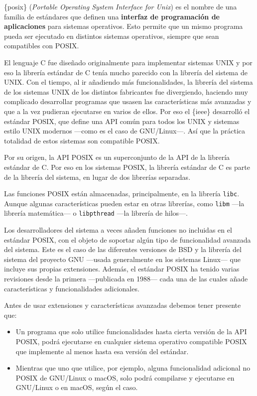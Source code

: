 \{posix\} (\emph{Portable Operating System Interface for Unix}) es el
nombre de una familia de estándares que definen una \textbf{interfaz de
programación de aplicaciones} para sistemas operativos. Esto permite que
un mismo programa pueda ser ejecutado en distintos sistemas operativos,
siempre que sean compatibles con POSIX.

El lenguaje C fue diseñado originalmente para implementar sistemas UNIX
y por eso la librería estándar de C tenía mucho parecido con la librería
del sistema de UNIX. Con el tiempo, al ir añadiendo más funcionalidades,
la librería del sistema de los sistemas UNIX de los distintos
fabricantes fue divergiendo, haciendo muy complicado desarrollar
programas que usasen las características más avanzadas y que a la vez
pudieran ejecutarse en varios de ellos. Por eso el \{ieee\} desarrolló
el estándar POSIX, que define una API común para todos los UNIX y
sistemas estilo UNIX modernos ---como es el caso de GNU/Linux---. Así
que la práctica totalidad de estos sistemas son compatible POSIX.

Por su origen, la API POSIX es un superconjunto de la API de la librería
estándar de C. Por eso en los sistemas POSIX, la librería estándar de C
es parte de la librería del sistema, en lugar de dos librerías
separadas.

Las funciones POSIX están almacenadas, principalmente, en la librería
\texttt{libc}. Aunque algunas características pueden estar en otras
librerías, como \texttt{libm} ---la librería matemática--- o
\texttt{libpthread} ---la librería de hilos---.

Los desarrolladores del sistema a veces añaden funciones no incluidas en
el estándar POSIX, con el objeto de soportar algún tipo de funcionalidad
avanzada del sistema. Este es el caso de las diferentes versiones de BSD
y la librería del sistema del proyecto GNU ---usada generalmente en los
sistemas Linux--- que incluye sus propias extensiones. Además, el
estándar POSIX ha tenido varias revisiones desde la primera ---publicada
en 1988--- cada una de las cuales añade características y
funcionalidades adicionales.

Antes de usar extensiones y características avanzadas debemos tener
presente que:

\begin{itemize}
\item
  Un programa que solo utilice funcionalidades hasta cierta versión de
  la API POSIX, podrá ejecutarse en cualquier sistema operativo
  compatible POSIX que implemente al menos hasta esa versión del
  estándar.
\item
  Mientras que uno que utilice, por ejemplo, alguna funcionalidad
  adicional no POSIX de GNU/Linux o macOS, solo podrá compilarse y
  ejecutarse en GNU/Linux o en macOS, según el caso.
\end{itemize}

